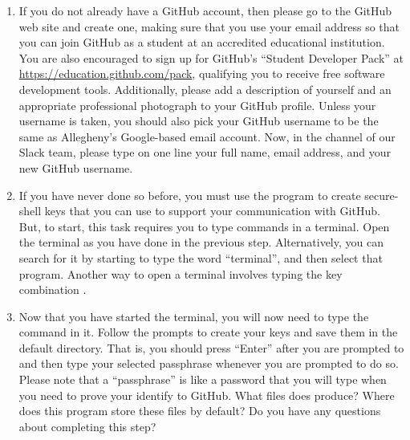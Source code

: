 \begin{enumerate}

  \item If you do not already have a GitHub account, then please go to the GitHub web site and create one, making sure
    that you use your  email address so that you can join GitHub as a student at an accredited
    educational institution. You are also encouraged to sign up for GitHub's ``Student Developer Pack'' at
    \url{https://education.github.com/pack}, qualifying you to receive free software development tools. Additionally,
    please add a description of yourself and an appropriate professional photograph to your GitHub profile. Unless your
    username is taken, you should also pick your GitHub username to be the same as Allegheny's Google-based email
    account. Now, in the  channel of our Slack team, please type on one line your full name,
     email address, and your new GitHub username. 

  \item If you have never done so before, you must use the  program to create secure-shell keys that
    you can use to support your communication with GitHub. But, to start, this task requires you to type commands in a terminal. Open the terminal as you have done in the previous step. Alternatively, you can search for it by starting to type the word ``terminal'', and then
    select that program. Another way to open a terminal involves typing the key combination .

  \item Now that you have started the terminal, you will now need to type the  command in it. Follow
    the prompts to create your keys and save them in the default directory. That is, you should press ``Enter'' after
    you are prompted to  and then type your selected passphrase
    whenever you are prompted to do so. Please note that a ``passphrase'' is like a password that you will type when you
    need to prove your identify to GitHub. What files does  produce? Where does this program store
    these files by default? Do you have any questions about completing this step?


\end{enumerate}
